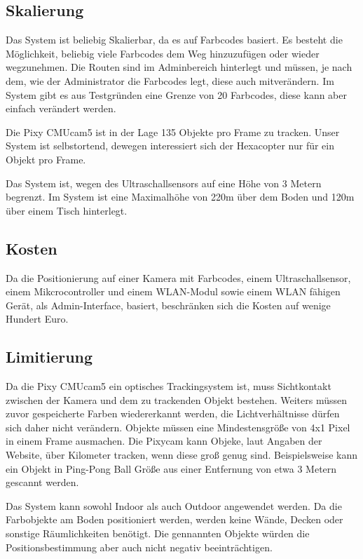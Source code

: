   \subsection*{Skalierung}
  Das System ist beliebig Skalierbar, da es auf Farbcodes basiert. Es besteht die Möglichkeit, beliebig viele Farbcodes dem Weg hinzuzufügen oder wieder wegzunehmen. Die Routen sind im Adminbereich hinterlegt und müssen, je nach dem, wie der Administrator die Farbcodes legt, diese auch mitverändern. Im System gibt es aus Testgründen eine Grenze von 20 Farbcodes, diese kann aber einfach verändert werden.

  Die Pixy CMUcam5 ist in der Lage 135 Objekte pro Frame zu tracken. Unser System ist selbstortend, dewegen interessiert sich der Hexacopter nur für ein Objekt pro Frame. \cite{PIXY_Porting_Examplecode}

  Das System ist, wegen des Ultraschallsensors auf eine Höhe von 3 Metern begrenzt. Im System ist eine Maximalhöhe von 220m über dem Boden und 120m über einem Tisch hinterlegt.

  \subsection*{Kosten}
  Da  die Positionierung auf einer Kamera mit Farbcodes, einem Ultraschallsensor, einem Mikcrocontroller und einem WLAN-Modul sowie einem WLAN fähigen Gerät, als Admin-Interface, basiert, beschränken sich die Kosten auf wenige Hundert Euro.

  \subsection*{Limitierung}
  Da die Pixy CMUcam5 ein optisches Trackingsystem ist, muss Sichtkontakt zwischen der Kamera und dem zu trackenden Objekt bestehen. Weiters müssen zuvor gespeicherte Farben wiedererkannt werden, die Lichtverhältnisse dürfen sich daher nicht verändern.  
  Objekte müssen eine Mindestensgröße von 4x1 Pixel in einem Frame ausmachen. Die Pixycam kann Objeke, laut Angaben der Website, über Kilometer tracken, wenn diese groß genug sind. Beispielsweise kann ein Objekt in Ping-Pong Ball Größe aus einer Entfernung von etwa 3 Metern gescannt werden. \cite{Pixy}

  Das System kann sowohl Indoor als auch Outdoor angewendet werden. Da die Farbobjekte am Boden positioniert werden, werden keine Wände, Decken oder sonstige Räumlichkeiten benötigt. Die gennannten Objekte würden die Positionsbestimmung aber auch nicht negativ beeinträchtigen.

